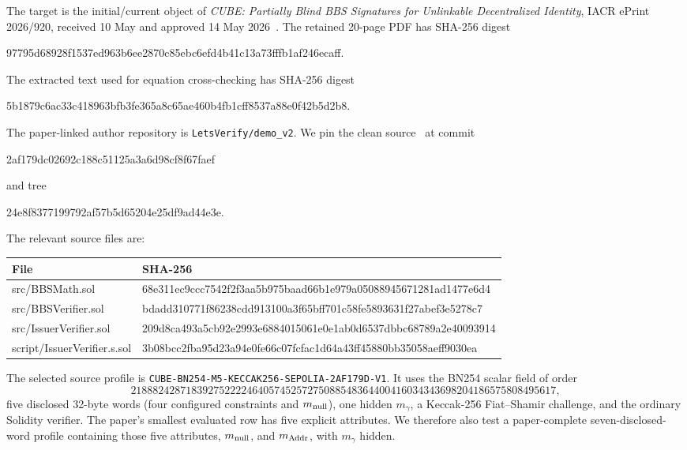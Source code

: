 \documentclass[10pt,a4paper]{article}
\begin{document}
The target is the initial/current object of \emph{CUBE: Partially Blind BBS
Signatures for Unlinkable Decentralized Identity}, IACR ePrint 2026/920,
received 10 May and approved 14 May 2026~\cite{cube}. The retained 20-page PDF
has SHA-256 digest
\begin{center}
\small\ttfamily
97795d68928f1537ed963b6ee2870c85ebc6efd4b41c13a73fffb1af246ecaff.
\end{center}
The extracted text used for equation cross-checking has SHA-256 digest
\begin{center}
\small\ttfamily
5b1879c6ac33c418963bfb3fe365a8c65ae460b4fb1cff8537a88e0f42b5d2b8.
\end{center}

The paper-linked author repository is \texttt{LetsVerify/demo\_v2}. We pin the
clean source~\cite{source} at commit
\begin{center}
\small\ttfamily
2af179dc02692c188c51125a3a6d98cf8f67faef
\end{center}
and tree
\begin{center}
\small\ttfamily
24e8f8377199792af57b5d65204e25df9ad44e3e.
\end{center}
The relevant source files are:

\begin{center}
\begin{tabularx}{\textwidth}{@{}>{\ttfamily\small}l X@{}}
\toprule
File & SHA-256 \\
\midrule
src/BBSMath.sol &
\ttfamily\small 68e311ec9ccc7542f2f3aa5b975baad66b1e979a05088945671281ad1477e6d4 \\
src/BBSVerifier.sol &
\ttfamily\small bdadd310771f86238cdd913100a3f65bff701c58fe5893631f27abef3e5278c7 \\
src/IssuerVerifier.sol &
\ttfamily\small 209d8ca493a5cb92e2993e6884015061e0e1ab0d6537dbbc68789a2e40093914 \\
script/IssuerVerifier.s.sol &
\ttfamily\small 3b08bcc2fba95d23a94e0fe66c07fcfac1d64a43ff45880bb35058aeff9030ea \\
\bottomrule
\end{tabularx}
\end{center}

The selected source profile is
\texttt{CUBE-BN254-M5-KECCAK256-SEPOLIA-2AF179D-V1}. It uses the BN254 scalar
field of order
\[
21888242871839275222246405745257275088548364400416034343698204186575808495617,
\]
five disclosed 32-byte words (four configured constraints and $m_{\rm null}$),
one hidden $m_\gamma$, a Keccak-256 Fiat--Shamir challenge, and the ordinary
Solidity verifier. The paper's smallest evaluated row has five explicit
attributes. We therefore also test a paper-complete seven-disclosed-word
profile containing those five attributes, $m_{\rm null}$, and $m_{\rm Addr}$,
with $m_\gamma$ hidden.
\end{document}
